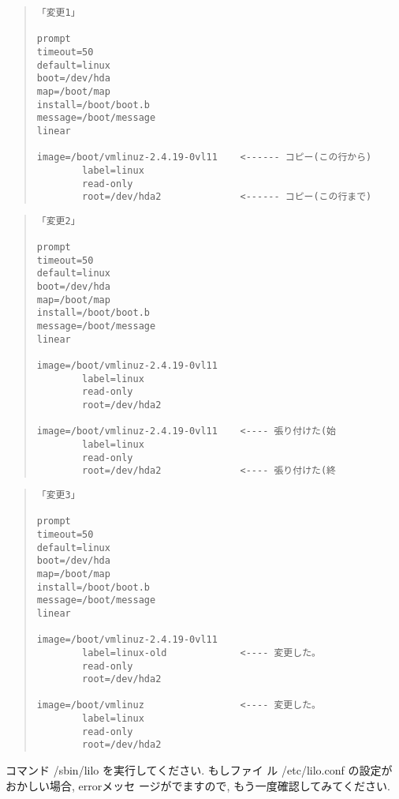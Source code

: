 \documentclass[a4paper,titlepage]{jreport}
\begin{document}
\begin{quote}
\begin{screen}
\begin{verbatim}
「変更1」

prompt
timeout=50
default=linux
boot=/dev/hda
map=/boot/map
install=/boot/boot.b
message=/boot/message
linear

image=/boot/vmlinuz-2.4.19-0vl11    <------ コピー(この行から)
        label=linux
        read-only
        root=/dev/hda2              <------ コピー(この行まで)

\end{verbatim}
\end{screen}
\end{quote}

\begin{quote}
\begin{screen}
\begin{verbatim}
「変更2」

prompt
timeout=50
default=linux
boot=/dev/hda
map=/boot/map
install=/boot/boot.b
message=/boot/message
linear

image=/boot/vmlinuz-2.4.19-0vl11    
        label=linux
        read-only
        root=/dev/hda2

image=/boot/vmlinuz-2.4.19-0vl11    <---- 張り付けた(始
        label=linux
        read-only
        root=/dev/hda2              <---- 張り付けた(終
\end{verbatim}
\end{screen}
\end{quote}

\begin{quote}
\begin{screen}
\begin{verbatim}
「変更3」

prompt
timeout=50
default=linux
boot=/dev/hda
map=/boot/map
install=/boot/boot.b
message=/boot/message
linear

image=/boot/vmlinuz-2.4.19-0vl11    
        label=linux-old             <---- 変更した。
        read-only
        root=/dev/hda2

image=/boot/vmlinuz                 <---- 変更した。   
        label=linux
        read-only
        root=/dev/hda2              
\end{verbatim}
\end{screen}
\end{quote}

コマンド /sbin/lilo を実行してください. もしファイ
ル /etc/lilo.conf の設定がおかしい場合, errorメッセ
ージがでますので, もう一度確認してみてください.
\end{document}

